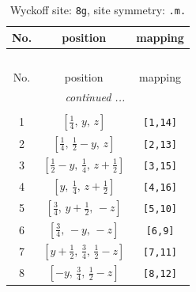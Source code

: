 \documentclass[fleqn,8pt]{jsarticle}
\begin{document}
\begin{longtable}{ccc}
\caption{Wyckoff site: {\tt 8g}, site symmetry: {\tt .m.}}
 \\
 \hline \hline
No. & position & mapping \\ \hline \endfirsthead

\multicolumn{2}{l}{\tablename\ \thetable{}} \\
 \hline \hline
No. & position & mapping \\ \hline \endhead

 \hline \hline
\multicolumn{2}{r}{\footnotesize\it continued ...} \\ \endfoot

 \hline \hline
\multicolumn{2}{r}{} \\ \endlastfoot

1 & $\left[ \frac{1}{4},\, y,\, z \right]$ & {\tt [1,14]} \\ \hline
2 & $\left[ \frac{1}{4},\, \frac{1}{2} - y,\, z \right]$ & {\tt [2,13]} \\ \hline
3 & $\left[ \frac{1}{2} - y,\, \frac{1}{4},\, z + \frac{1}{2} \right]$ & {\tt [3,15]} \\ \hline
4 & $\left[ y,\, \frac{1}{4},\, z + \frac{1}{2} \right]$ & {\tt [4,16]} \\ \hline
5 & $\left[ \frac{3}{4},\, y + \frac{1}{2},\, - z \right]$ & {\tt [5,10]} \\ \hline
6 & $\left[ \frac{3}{4},\, - y,\, - z \right]$ & {\tt [6,9]} \\ \hline
7 & $\left[ y + \frac{1}{2},\, \frac{3}{4},\, \frac{1}{2} - z \right]$ & {\tt [7,11]} \\ \hline
8 & $\left[ - y,\, \frac{3}{4},\, \frac{1}{2} - z \right]$ & {\tt [8,12]} \\
\end{longtable}
\renewcommand{\arraystretch}{1.2}
\end{document}
